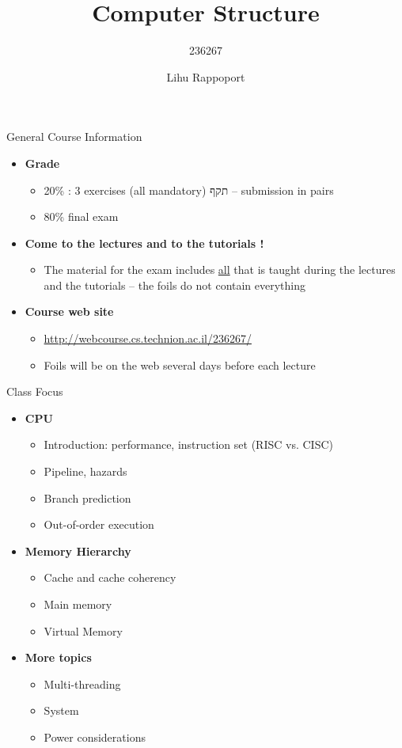 \documentclass[aspectratio=169,12pt]{beamer}
\title{Computer Structure}
\subtitle{236267}
\author{Lihu Rappoport}
\date{}
\begin{document}
\frame{\titlepage}

\begin{frame}{General Course Information}
\begin{itemize}
    \item \textbf{Grade}
    \begin{itemize}
        \item 20\% : 3 exercises (all mandatory) תקף -- submission in pairs
        \item 80\% final exam
    \end{itemize}
    \item \textbf{Come to the lectures and to the tutorials !}
    \begin{itemize}
        \item The material for the exam includes \underline{all} that is taught during the lectures and the tutorials -- the foils do not contain everything
    \end{itemize}
    \item \textbf{Course web site}
    \begin{itemize}
        \item \url{http://webcourse.cs.technion.ac.il/236267/}
        \item Foils will be on the web several days before each lecture
    \end{itemize}
\end{itemize}
\end{frame}

\begin{frame}{Class Focus}
\begin{itemize}
    \item \textbf{CPU}
    \begin{itemize}
        \item Introduction: performance, instruction set (RISC vs. CISC)
        \item Pipeline, hazards
        \item Branch prediction
        \item Out-of-order execution
    \end{itemize}
    \item \textbf{Memory Hierarchy}
    \begin{itemize}
        \item Cache and cache coherency
        \item Main memory
        \item Virtual Memory
    \end{itemize}
    \item \textbf{More topics}
    \begin{itemize}
        \item Multi-threading
        \item System
        \item Power considerations
    \end{itemize}
\end{itemize}
\end{frame}
\end{document}
